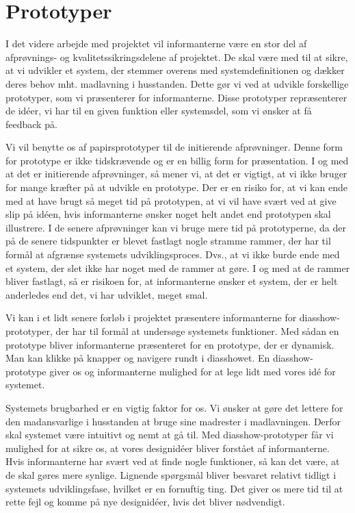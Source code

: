 \section{Prototyper}
I det videre arbejde med projektet vil informanterne være en stor del af afprøvnings- og kvalitetssikringsdelene af projektet. De skal være med til at sikre, at vi udvikler et system, der stemmer overens med systemdefinitionen og dækker deres behov mht. madlavning i husstanden. Dette gør vi ved at udvikle forskellige prototyper, som vi præsenterer for informanterne. Disse prototyper repræsenterer de idéer, vi har til en given funktion eller systemsdel, som vi ønsker at få feedback på.

Vi vil benytte os af papirsprototyper til de initierende afprøvninger. Denne form for prototype er ikke tidskrævende og er en billig form for præsentation. I og med at det er initierende afprøvninger, så mener vi, at det er vigtigt, at vi ikke bruger for mange kræfter på at udvikle en prototype. Der er en risiko for, at vi kan ende med at have brugt så meget tid på prototypen, at vi vil have svært ved at give slip på idéen, hvis informanterne ønsker noget helt andet end prototypen skal illustrere. I de senere afprøvninger kan vi bruge mere tid på prototyperne, da der på de senere tidspunkter er blevet fastlagt nogle stramme rammer, der har til formål at afgrænse systemets udviklingsproces. Dvs., at vi ikke burde ende med et system, der slet ikke har noget med de rammer at gøre. I og med at de rammer bliver fastlagt, så er risikoen for, at informanterne ønsker et system, der er helt anderledes end det, vi har udviklet, meget smal.

Vi kan i et lidt senere forløb i projektet præsentere informanterne for diasshow-prototyper, der har til formål at undersøge systemets funktioner. Med sådan en prototype bliver informanterne præsenteret for en prototype, der er dynamisk. Man kan klikke på knapper og navigere rundt i diasshowet. En diasshow-prototype giver os og informanterne mulighed for at lege lidt med vores idé for systemet. 

Systemets brugbarhed er en vigtig faktor for os. Vi ønsker at gøre det lettere for den madansvarlige i husstanden at bruge sine madrester i madlavningen. Derfor skal systemet være intuitivt og nemt at gå til. Med diasshow-prototyper får vi mulighed for at sikre os, at vores designidéer bliver forstået af informanterne. Hvis informanterne \fx har svært ved at finde nogle funktioner, så kan det være, at de skal gøres mere synlige. Lignende spørgsmål bliver besvaret relativt tidligt i systemets udviklingsfase, hvilket er en fornuftig ting. Det giver os mere tid til at rette fejl og komme på nye designidéer, hvis det bliver nødvendigt.

